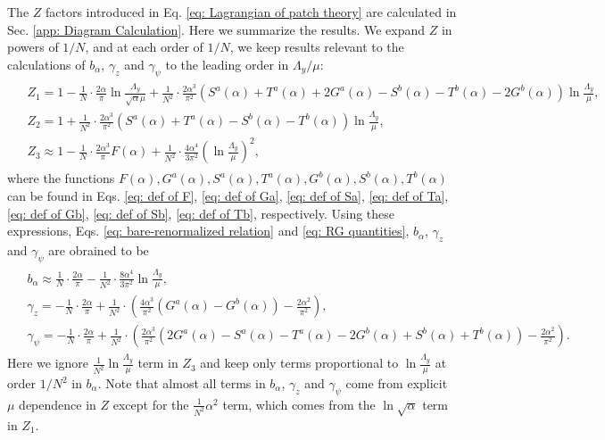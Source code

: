 \documentclass[prx,amsmath,amssymb, notitlepage, onecolumn,
nofootinbib,
superscriptaddress,
longbibliography
]{revtex4-1}
\newcommand{\beq}{\begin{eqnarray}}
\newcommand{\eeq}{\end{eqnarray}}
\begin{document}
The $Z$ factors introduced in Eq. \eqref{eq: Lagrangian of patch theory} are calculated in Sec. \ref{app: Diagram Calculation}. 
Here we summarize the results. 
We expand $Z$ in powers of $1/N$, and at each order of $1/N$, we keep results relevant to the calculations of $b_\alpha$, $\gamma_z$ and $\gamma_\psi$ to the leading order in $\Lambda_y/\mu$:
\beq
\begin{split}
	&Z_1=1-\frac{1}{N}\cdot\frac{2\alpha}{\pi}\ln\frac{\Lambda_y}{\sqrt{\alpha}\mu}+\frac{1}{N^2}\cdot\frac{2\alpha^3}{\pi^2}\left(S^a(\alpha)+T^a(\alpha)+2G^a(\alpha)-S^b(\alpha)-T^b(\alpha)-2G^b(\alpha)\right)\ln\frac{\Lambda_y}{\mu},\\
	&Z_2=1+\frac{1}{N^2}\cdot\frac{2\alpha^3}{\pi^2}\left(S^a(\alpha)+T^a(\alpha)-S^b(\alpha)-T^b(\alpha)\right)\ln\frac{\Lambda_y}{\mu},\\
	&Z_3\approx1-\frac{1}{N}\cdot\frac{2\alpha^3}{\pi}F(\alpha)+\frac{1}{N^2}\cdot\frac{4\alpha^4}{3\pi^2}\left(\ln\frac{\Lambda_y}{\mu}\right)^2,
\end{split}
\eeq
where the functions $F(\alpha),G^{a}(\alpha),S^{a}(\alpha),T^{a}(\alpha),G^{b}(\alpha),S^{b}(\alpha),T^{b}(\alpha)$ can be found in Eqs. \eqref{eq: def of F}, \eqref{eq: def of Ga}, \eqref{eq: def of Sa}, \eqref{eq: def of Ta}, \eqref{eq: def of Gb}, \eqref{eq: def of Sb}, \eqref{eq: def of Tb}, respectively.
%
Using these expressions,
Eqs. \eqref{eq: bare-renormalized relation} and \eqref{eq: RG quantities}, $b_\alpha$, $\gamma_z$ and $\gamma_\psi$ are obrained to be
\beq
\begin{split}
	&b_\alpha\approx\frac{1}{N}\cdot\frac{2\alpha}{\pi} -\frac{1}{N^2}\cdot\frac{8\alpha^4}{3\pi^2}\ln\frac{\Lambda_y}{\mu},\\
	&\gamma_z=-\frac{1}{N}\cdot\frac{2\alpha}{\pi}+\frac{1}{N^2}\cdot\left(\frac{4\alpha^3}{\pi^2}\left(G^a(\alpha)-G^b(\alpha)\right)-\frac{2\alpha^2}{\pi^2}\right),\\
	&\gamma_\psi=-\frac{1}{N}\cdot\frac{2\alpha}{\pi}+\frac{1}{N^2}\cdot\left(\frac{2\alpha^3}{\pi^2}\left(2G^a(\alpha)-S^a(\alpha)-T^a(\alpha)-2G^b(\alpha)+S^b(\alpha)+T^b(\alpha)\right)-\frac{2\alpha^2}{\pi^2}\right).
\end{split}
\eeq
Here we ignore $\frac{1}{N^2}\ln\frac{\Lambda_y}{\mu}$ term in $Z_3$ and keep only terms proportional to $\ln\frac{\Lambda_y}{\mu}$ at order $1/N^2$ in $b_\alpha$. Note that almost all terms in $b_\alpha$, $\gamma_z$ and $\gamma_\psi$ come from explicit $\mu$ dependence in $Z$ except for the $\frac{1}{N^2}\alpha^2$ term, which comes from the $\ln\sqrt{\alpha}$ term in $Z_1$. 
\end{document}

